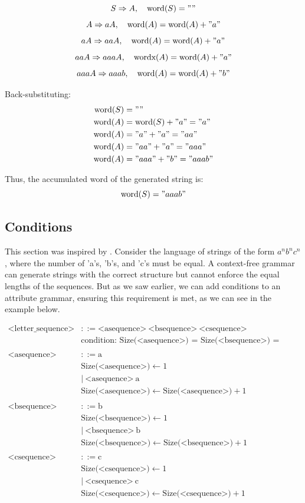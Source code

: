 \[S \Rightarrow A , \quad  \text{word}(S) = "" \]
\[ A \Rightarrow aA , \quad  \text{word}(A) = \text{word}(A) + "a" \]
\[  aA \Rightarrow aaA , \quad \text{word}(A) = \text{word}(A) + "a" \]
\[  aaA \Rightarrow aaaA , \quad \text{wordx}(A) = \text{word}(A) + "a" \]
\[  aaaA \Rightarrow aaab , \quad  \text{word}(A) = \text{word}(A) + "b" \]

Back-substituting:
\[
\begin{aligned}
\text{word}(S) &= "" \\
\text{word}(A) &= \text{word}(S) + "a" = "a" \\
\text{word}(A) &= "a" + "a" = "aa" \\
\text{word}(A) &= "aa" + "a" = "aaa" \\
\text{word}(A) &= "aaa" + "b" = "aaab"
\end{aligned}
\]

Thus, the accumulated word of the generated string is:
\[
\text{word}(S) = "aaab"
\]

\subsection{Conditions}

This section was inspired by \cite{chapter}.
Consider the language of strings of the form \(a^n b^n c^n\), where the number of 'a's, 'b's, and 'c's must be equal. 
A context-free grammar can generate strings with the correct structure but cannot enforce the equal lengths of the sequences. 
But as we saw earlier, we can add conditions to an attribute grammar, ensuring this requirement is met, as we can see in the example below.

\[
\begin{aligned}
  \text{<letter\_sequence>} &::= \text{<asequence>} \ \text{<bsequence>} \ \text{<csequence>} \\
  &\text{condition: Size(<asequence>) = Size(<bsequence>) = Size(<csequence>)} \\
  \\
  \text{<asequence>} &::= \text{a} \\
  &\text{Size(<asequence>)} \leftarrow 1 \\
  &| \ \text{<asequence>} \ \text{a} \\
  &\text{Size(<asequence>)} \leftarrow \text{Size(<asequence>)} + 1 \\
  \\
  \text{<bsequence>} &::= \text{b} \\
  &\text{Size(<bsequence>)} \leftarrow 1 \\
  &| \ \text{<bsequence>} \ \text{b} \\
  &\text{Size(<bsequence>)} \leftarrow \text{Size(<bsequence>)} + 1 \\
  \\
  \text{<csequence>} &::= \text{c} \\
  &\text{Size(<csequence>)} \leftarrow 1 \\
  &| \ \text{<csequence>} \ \text{c} \\
  &\text{Size(<csequence>)} \leftarrow \text{Size(<csequence>)} + 1   
\end{aligned}
\]

